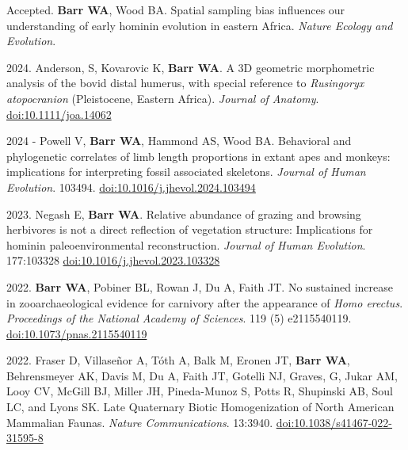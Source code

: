 \begin{etaremune} 


\item Accepted. {\bfseries Barr WA}, Wood BA. Spatial sampling bias influences our understanding of early hominin evolution in eastern Africa. \emph{Nature Ecology and Evolution}.

\item 2024. Anderson, S, Kovarovic K,  {\bfseries Barr WA}. A 3D geometric morphometric analysis of the bovid distal humerus, with special reference to \emph{Rusingoryx atopocranion} (Pleistocene, Eastern Africa). \emph{Journal of Anatomy}. \newline \href{https://doi.org/10.1111/joa.14062}{doi:10.1111/joa.14062}

\item 2024 - Powell V, {\bfseries Barr WA}, Hammond AS, Wood BA. Behavioral and phylogenetic correlates of limb length proportions in extant apes and monkeys: implications for interpreting fossil associated skeletons. \emph{Journal of Human Evolution}. 103494. \href{https://doi.org/10.1016/j.jhevol.2024.103494}{doi:10.1016/j.jhevol.2024.103494}

\item 2023. Negash E, {\bfseries Barr WA}. Relative abundance of grazing and browsing herbivores is not a direct reflection of vegetation structure: Implications for hominin paleoenvironmental reconstruction. \emph{Journal of Human Evolution}. 177:103328 \href{https://doi.org/10.1016/j.jhevol.2023.103328}{doi:10.1016/j.jhevol.2023.103328}


\item 2022. {\bfseries Barr WA}, Pobiner BL, Rowan J, Du A, Faith JT.  No sustained increase in zooarchaeological evidence for carnivory after the appearance of \emph{Homo erectus}. \emph{Proceedings of the National Academy of Sciences}. 119 (5) e2115540119. \href{https://doi.org/10.1073/pnas.2115540119}{doi:10.1073/pnas.2115540119}

\item 2022. Fraser D, Villaseñor A, Tóth A, Balk M, Eronen JT, {\bfseries Barr WA}, Behrensmeyer AK, Davis M, Du A, Faith JT, Gotelli NJ, Graves, G, Jukar AM, Looy CV, McGill BJ, Miller JH, Pineda-Munoz S, Potts R,  Shupinski AB, Soul LC, and Lyons SK. Late Quaternary Biotic Homogenization of North American Mammalian Faunas. \emph{Nature Communications}. 13:3940. \href{https://doi.org/10.1038/s41467-022-31595-8}{doi:10.1038/s41467-022-31595-8}




\end{etaremune}
